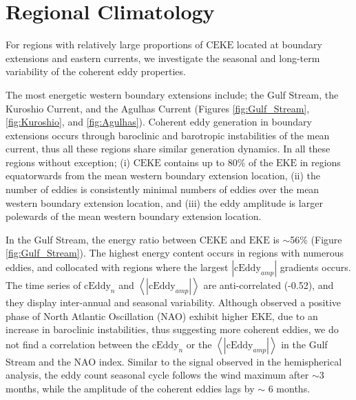 \documentclass[draft,linenumbers]{agujournal2019}
\newcommand{\EKE}{\textrm{EKE}}
\newcommand{\CEKE}{\textrm{CEKE}}
\newcommand{\cEddy}{\textrm{cEddy}}
\begin{document}

	\section{Regional Climatology}
	\label{sec:CE_regional_stats}
	
	For regions with relatively large proportions of $\CEKE$ located at boundary extensions and eastern currents, we investigate the seasonal and long-term variability of the coherent eddy properties.

	
	The most energetic western boundary extensions include; the Gulf Stream, the Kuroshio Current, and the Agulhas Current (Figures \ref{fig:Gulf_Stream}, \ref{fig:Kuroshio}, and \ref{fig:Agulhas}). 
	Coherent eddy generation in boundary extensions occurs through baroclinic and barotropic instabilities of the mean current, thus all these regions share similar generation dynamics. 
	In all these regions without exception; (i) $\CEKE$ contains up to 80\% of the $\EKE$ in regions equatorwards from the mean western boundary extension location, (ii) the number of eddies is consistently minimal numbers of eddies over the mean western boundary extension location, and (iii) the eddy amplitude is larger polewards of the mean western boundary extension location. 

	In the Gulf Stream, the energy ratio between $\CEKE$ and $\EKE$ is $\sim$56\% (Figure \ref{fig:Gulf_Stream}). 
	The highest energy content occurs in regions with numerous eddies, and collocated with regions where the largest $|\cEddy_{amp}|$ gradients occurs. 
	The time series of $\cEddy_{n}$ and $\left<|\cEddy_{amp}|\right>$ are anti-correlated (-0.52), and they display inter-annual and seasonal variability. 
	Although \citet{Chaudhuri_Oscillation_2009} observed a positive phase of North Atlantic Oscillation (NAO) exhibit higher $\EKE$, due to an increase in baroclinic instabilities, thus suggesting more coherent eddies, we do not find a correlation between the $\cEddy_{n}$ or the $\left<|\cEddy_{amp}|\right>$ in the Gulf Stream and the NAO index. 
	Similar to the signal observed in the hemispherical analysis, the eddy count seasonal cycle follows the wind maximum after $\sim$3 months, while the amplitude of the coherent eddies lags by $\sim$ 6 months. 
\end{document}
